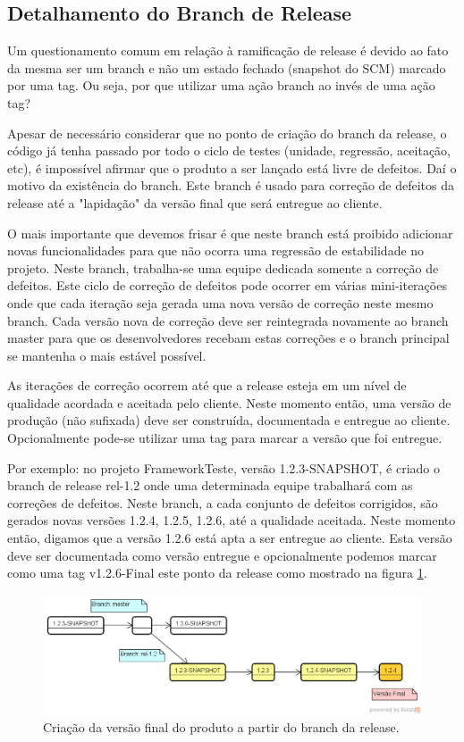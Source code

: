\subsection{Detalhamento do Branch de Release}
\label{subsec:detalherelease}
Um questionamento comum em relação à ramificação de release é devido ao fato da mesma ser um branch e não um estado fechado (snapshot do SCM) marcado por uma tag. Ou seja, por que utilizar uma ação branch ao invés de uma ação tag?

Apesar de necessário considerar que no ponto de criação do branch da release, o código já tenha passado por todo o ciclo de testes (unidade, regressão, aceitação, etc), é impossível afirmar que o produto a ser lançado está livre de defeitos. Daí o motivo da existência do branch. Este branch é usado para correção de defeitos da release até a "lapidação" da versão final que será entregue ao cliente. 

O mais importante que devemos frisar é que neste branch está proibido adicionar novas funcionalidades para que não ocorra uma regressão de estabilidade no projeto. Neste branch, trabalha-se uma equipe dedicada somente a correção de defeitos. Este ciclo de correção de defeitos pode ocorrer em várias mini-iterações onde que cada iteração seja gerada uma nova versão de correção neste mesmo branch. Cada versão nova de correção deve ser reintegrada novamente ao branch master para que os desenvolvedores  recebam estas correções e o branch principal se mantenha o mais estável possível. 

As iterações de correção ocorrem até que a release esteja em um nível de qualidade acordada e aceitada pelo cliente. Neste momento então, uma versão de produção (não sufixada) deve ser construída, documentada e entregue ao cliente. Opcionalmente pode-se utilizar uma tag para marcar a versão que foi entregue. 

Por exemplo: no projeto FrameworkTeste, versão 1.2.3-SNAPSHOT, é criado o branch de release rel-1.2 onde uma determinada equipe trabalhará com as correções de defeitos. Neste branch, a cada conjunto de defeitos corrigidos, são gerados novas versões 1.2.4, 1.2.5, 1.2.6, até a qualidade aceitada. Neste momento então, digamos que a versão 1.2.6 está apta a ser entregue ao cliente. Esta versão deve ser documentada como versão entregue e opcionalmente podemos marcar como uma tag v1.2.6-Final este ponto da release como mostrado na figura \ref{fig:finalrelease}.

\begin{figure}[h!]
	\centering
	\includegraphics[width=0.7\linewidth]{img/branching_otojr_02}
	\caption[Criação da versão final]{Criação da versão final do produto a partir do branch da release.}
	\label{fig:finalrelease}
\end{figure}


